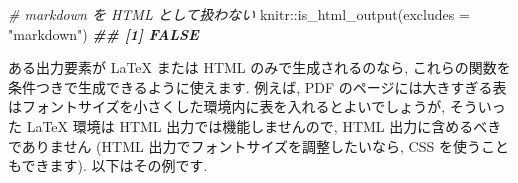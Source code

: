 \documentclass[
  11pt,
  lualatex,
  ja=standard]{bxjsreport}
\newenvironment{Shaded}{\begin{snugshade}}{\end{snugshade}}
\newcommand{\AttributeTok}[1]{\textcolor[rgb]{0.77,0.63,0.00}{#1}}
\newcommand{\CommentTok}[1]{\textcolor[rgb]{0.56,0.35,0.01}{\textit{#1}}}
\newcommand{\DocumentationTok}[1]{\textcolor[rgb]{0.56,0.35,0.01}{\textbf{\textit{#1}}}}
\newcommand{\FunctionTok}[1]{\textcolor[rgb]{0.00,0.00,0.00}{#1}}
\newcommand{\NormalTok}[1]{#1}
\newcommand{\SpecialCharTok}[1]{\textcolor[rgb]{0.00,0.00,0.00}{#1}}
\newcommand{\StringTok}[1]{\textcolor[rgb]{0.31,0.60,0.02}{#1}}
\begin{document}
\begin{Shaded}
\begin{Highlighting}[numbers=left,,]
\CommentTok{\# markdown を HTML として扱わない}
\NormalTok{knitr}\SpecialCharTok{::}\FunctionTok{is\_html\_output}\NormalTok{(}\AttributeTok{excludes =} \StringTok{"markdown"}\NormalTok{)}
\DocumentationTok{\#\# [1] FALSE}
\end{Highlighting}
\end{Shaded}

ある出力要素が LaTeX または HTML のみで生成されるのなら, これらの関数を条件つきで生成できるように使えます. 例えば, PDF のページには大きすぎる表はフォントサイズを小さくした環境内に表を入れるとよいでしょうが, そういった LaTeX 環境は HTML 出力では機能しませんので, HTML 出力に含めるべきでありません (HTML 出力でフォントサイズを調整したいなら, CSS を使うこともできます). 以下はその例です.
\end{document}
